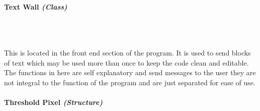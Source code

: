 \begin{FlushLeft}
    \bk


    \paragraph{Text Wall \textit{(Class)}} \mbox{} \\

    \begin{figure}[H]
        \centering
    \end{figure}\\

    This is located in the front end section of the program. It is used to send blocks of text which may be used more than once to keep the code clean and editable. The functions in here are self explanatory and send messages to the user they are not integral to the function of the program and are just separated for ease of use. \\ 

    \bk

    \paragraph{Threshold Pixel \textit{(Structure)}} \mbox{} \\

    \begin{figure}[H]
        \centering
    \end{figure}\\


\end{FlushLeft}
